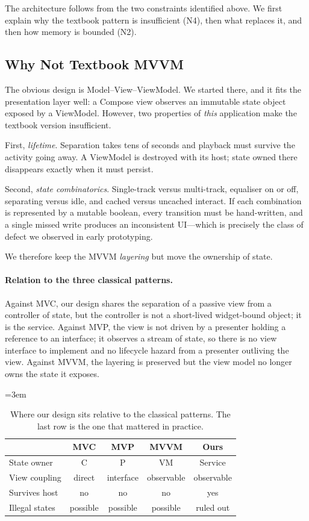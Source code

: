 \documentclass[letterpaper]{article} %
\newcommand{\nohyph}{\hyphenpenalty=10000 \exhyphenpenalty=10000 \tolerance=10000 \emergencystretch=3em}
\begin{document}
The architecture follows from the two constraints identified above. We first
explain why the textbook pattern is insufficient (N4), then what replaces it,
and then how memory is bounded (N2).

\subsection{Why Not Textbook MVVM}

The obvious design is Model--View--ViewModel. We started there, and it fits the
presentation layer well: a Compose view observes an immutable state object
exposed by a ViewModel. However, two properties of \emph{this} application make
the textbook version insufficient.

First, \emph{lifetime}. Separation takes tens of seconds and playback must
survive the activity going away. A ViewModel is destroyed with its host; state
owned there disappears exactly when it must persist.

Second, \emph{state combinatorics}. Single-track versus multi-track, equaliser
on or off, separating versus idle, and cached versus uncached interact. If each
combination is represented by a mutable boolean, every transition must be
hand-written, and a single missed write produces an inconsistent UI---which is
precisely the class of defect we observed in early prototyping.

We therefore keep the MVVM \emph{layering} but move the ownership of state.

\paragraph{Relation to the three classical patterns.} Against MVC, our design
shares the separation of a passive view from a controller of state, but the
controller is not a short-lived widget-bound object; it is the service. Against
MVP, the view is not driven by a presenter holding a reference to an interface;
it observes a stream of state, so there is no view interface to implement and
no lifecycle hazard from a presenter outliving the view. Against MVVM, the
layering is preserved but the view model no longer owns the state it exposes.

\begin{table}[h]
\begingroup
\centering
\footnotesize
\nohyph
\setlength{\tabcolsep}{3pt}
\begin{tabular}{@{}l c c c c@{}}
\hline
 & \textbf{MVC} & \textbf{MVP} & \textbf{MVVM} & \textbf{Ours} \\
\hline
State owner      & C         & P          & VM         & Service \\
View coupling    & direct    & interface  & observable & observable \\
Survives host    & no        & no         & no         & yes \\
Illegal states   & possible  & possible   & possible   & ruled out \\
\hline
\end{tabular}
\caption{Where our design sits relative to the classical patterns. The last
row is the one that mattered in practice.}
\label{tab:patterns}
\endgroup
\end{table}
\end{document}
